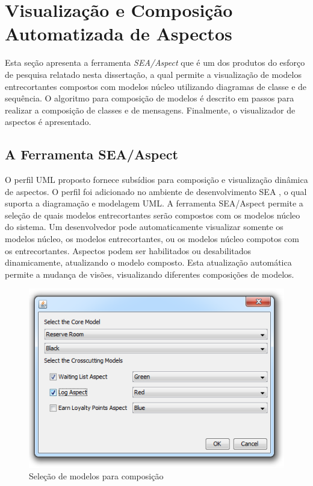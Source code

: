 \section{Visualização e Composição Automatizada de Aspectos}

Esta seção apresenta a ferramenta \textit{SEA/Aspect} que é um dos produtos do esforço de pesquisa relatado nesta dissertação, a qual permite a
visualização de modelos entrecortantes compostos com modelos núcleo utilizando diagramas de classe e de sequência. O algoritmo para composição de 
modelos é descrito em passos para realizar a composição de classes e de mensagens. Finalmente, o visualizador de aspectos é apresentado.

\subsection{A Ferramenta SEA/Aspect}

O perfil UML proposto fornece subsídios para composição e visualização dinâmica de aspectos. O perfil foi adicionado no ambiente de desenvolvimento
SEA \cite{silva:00}, o qual suporta a diagramação e modelagem UML. A ferramenta SEA/Aspect permite a seleção de quais modelos entrecortantes serão
compostos com os modelos núcleo do sistema. Um desenvolvedor pode automaticamente visualizar somente os modelos núcleo, os modelos entrecortantes, ou
os modelos núcleo compotos com os entrecortantes. Aspectos podem ser habilitados ou desabilitados dinamicamente, atualizando o modelo composto. Esta
atualização automática permite a mudança de visões, visualizando diferentes composições de modelos.

  \begin{figure}[!h]
	\centering
	\includegraphics{img/selection_screen.png}
	\caption{Seleção de modelos para composição}\label{fig:selection_screen}
  \end{figure}

